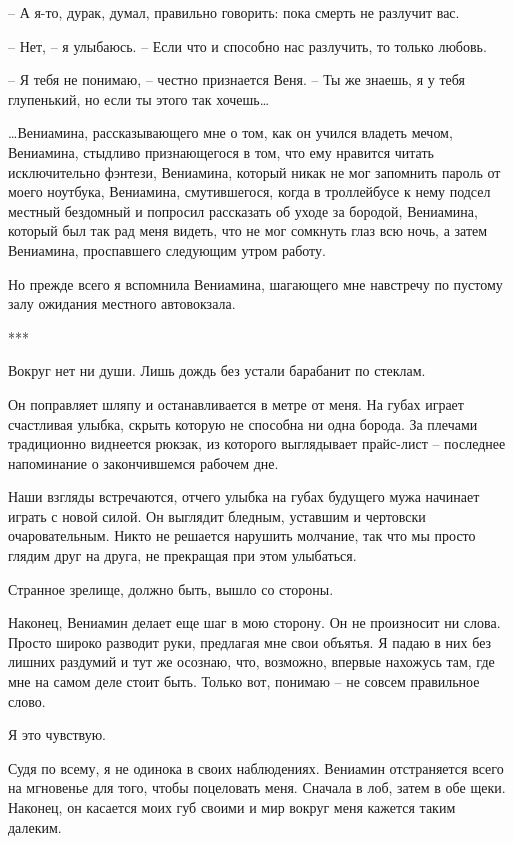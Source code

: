 \documentclass[
]{book}
\begin{document}
-- А я-то, дурак, думал, правильно говорить: пока смерть не разлучит вас.

-- Нет, -- я улыбаюсь. -- Если что и способно нас разлучить, то только любовь.

-- Я тебя не понимаю, -- честно признается Веня. -- Ты же знаешь, я у тебя глупенький, но если ты этого так хочешь\ldots{}

\ldots Вениамина, рассказывающего мне о том, как он учился владеть мечом, Вениамина, стыдливо признающегося в том, что ему нравится читать исключительно фэнтези, Вениамина, который никак не мог запомнить пароль от моего ноутбука, Вениамина, смутившегося, когда в троллейбусе к нему подсел местный бездомный и попросил рассказать об уходе за бородой, Вениамина, который был так рад меня видеть, что не мог сомкнуть глаз всю ночь, а затем Вениамина, проспавшего следующим утром работу.

Но прежде всего я вспомнила Вениамина, шагающего мне навстречу по пустому залу ожидания местного автовокзала.

***

Вокруг нет ни души. Лишь дождь без устали барабанит по стеклам.

Он поправляет шляпу и останавливается в метре от меня. На губах играет счастливая улыбка, скрыть которую не способна ни одна борода. За плечами традиционно виднеется рюкзак, из которого выглядывает прайс-лист -- последнее напоминание о закончившемся рабочем дне.

Наши взгляды встречаются, отчего улыбка на губах будущего мужа начинает играть с новой силой. Он выглядит бледным, уставшим и чертовски очаровательным. Никто не решается нарушить молчание, так что мы просто глядим друг на друга, не прекращая при этом улыбаться.

Странное зрелище, должно быть, вышло со стороны.

Наконец, Вениамин делает еще шаг в мою сторону. Он не произносит ни слова. Просто широко разводит руки, предлагая мне свои объятья. Я падаю в них без лишних раздумий и тут же осознаю, что, возможно, впервые нахожусь там, где мне на самом деле стоит быть. Только вот, понимаю -- не совсем правильное слово.

Я это чувствую.

Судя по всему, я не одинока в своих наблюдениях. Вениамин отстраняется всего на мгновенье для того, чтобы поцеловать меня. Сначала в лоб, затем в обе щеки. Наконец, он касается моих губ своими и мир вокруг меня кажется таким далеким.
\end{document}

